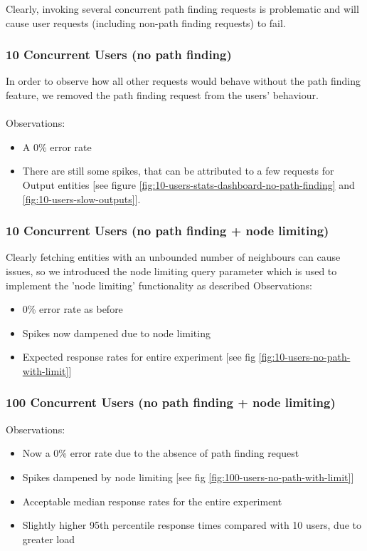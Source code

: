 Clearly, invoking several concurrent path finding requests is problematic and will cause user requests (including non-path finding requests) to fail. 

\subsubsection{10 Concurrent Users (no path finding)}
In order to observe how all other requests would behave without the path finding feature, we removed the path finding request from the users' behaviour. 
\\\\
Observations:
\begin{itemize}
    \item A 0\% error rate
    \item There are still some spikes, that can be attributed to a few requests for Output entities [see figure \ref{fig:10-users-stats-dashboard-no-path-finding} and \ref{fig:10-users-slow-outputs}]. 
\end{itemize}

\subsubsection{10 Concurrent Users (no path finding + node limiting)}
Clearly fetching entities with an unbounded number of neighbours can cause issues, so we introduced the node limiting query parameter which is used to implement the 'node limiting' functionality as described
Observations:
\begin{itemize}
    \item 0\% error rate as before 
    \item Spikes now dampened due to node limiting
    \item Expected response rates for entire experiment [see fig \ref{fig:10-users-no-path-with-limit}]
\end{itemize}

\subsubsection{100 Concurrent Users (no path finding + node limiting)}
Observations:
\begin{itemize}
    \item Now a 0\% error rate due to the absence of path finding request
    \item Spikes dampened by node limiting [see fig \ref{fig:100-users-no-path-with-limit}]
    \item Acceptable median response rates for the entire experiment
    \item Slightly higher 95th percentile response times compared with 10 users, due to greater load
\end{itemize}

